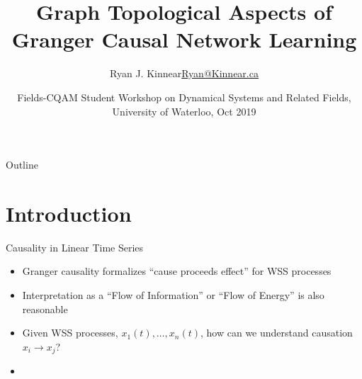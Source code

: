\documentclass{beamer} %
\title{Graph Topological Aspects of Granger Causal Network Learning}
\author{\texorpdfstring{Ryan J. Kinnear\newline\url{Ryan@Kinnear.ca}}{Ryan J. Kinnear}}%
\institute[University of Waterloo] %
{
  University of Waterloo\\
  Department of Electrical and Computer Engineering
}
\date{Fields-CQAM Student Workshop on Dynamical Systems and Related Fields, University of Waterloo, Oct 2019}
\begin{document}
\begin{frame}
  \titlepage
\end{frame}

\begin{frame}{Outline}
  \tableofcontents
\end{frame}

\section{Introduction}



\begin{frame}{Causality in Linear Time Series}
  \begin{itemize}
    \item{Granger causality formalizes ``cause proceeds effect'' for WSS processes}\pause
    \item{Interpretation as a ``Flow of Information'' or ``Flow of Energy'' is also reasonable}\pause
    \item{Given WSS processes, $x_1(t), \ldots, x_n(t)$, how can we understand causation $x_i \rightarrow x_j$?}\pause
    \item{}
  \end{itemize}
\end{frame}
\end{document}
